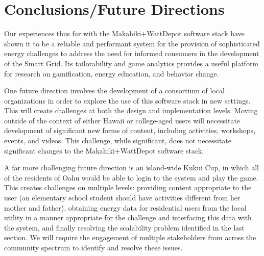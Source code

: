 \section{Conclusions/Future Directions}

Our experiences thus far with the Makahiki+WattDepot software stack have shown it to be a
reliable and performant system for the provision of sophisticated energy challenges to
address the need for informed consumers in the development of the Smart Grid. Its
tailorability and game analytics provides a useful platform for research on gamification,
energy education, and behavior change.


One future direction involves the development of a consortium of local organizations in
order to explore the use of this software stack in new settings.  This will create
challenges at both the design and implementation levels.   Moving outside of the context
of either Hawaii or college-aged users will necessitate development of significant new
forms of content, including activities, workshops, events, and videos. This challenge,
while significant, does not necessitate significant changes to the Makahiki+WattDepot
software stack.

A far more challenging future direction is an island-wide Kukui Cup, in which all of the residents of
Oahu would be able to login to the system and play the game. This creates challenges on
multiple levels: providing content appropriate to the user (an elementary school student should
have activities different from her mother and father), obtaining energy data for
residential users from the local utility in a manner appropriate for the challenge and
interfacing this data with the system, and finally resolving the scalability problem
identified in the last section.  We will require the engagement of multiple stakeholders
from across the community spectrum to identify and resolve these issues. 
